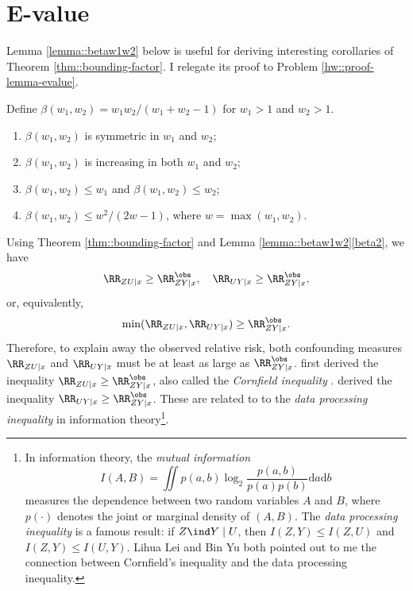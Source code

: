 \section{E-value}

Lemma \ref{lemma::betaw1w2} below is useful for deriving interesting corollaries of Theorem \ref{thm::bounding-factor}. I relegate its proof to Problem \ref{hw::proof-lemma-evalue}. 

\begin{lemma}
\label{lemma::betaw1w2}
Define $\beta(w_1, w_2) = w_1 w_2/(w_1 + w_2 - 1)$ for $w_1 > 1$ and $w_2 > 1$.  
\begin{enumerate}
[(1)]
\item
$\beta(w_1, w_2)$ is symmetric in $w_1$ and $w_2$;
\item
$\beta(w_1, w_2)$ is increasing in both $w_1$ and $w_2$;
\item\label{beta2}
$\beta(w_1, w_2) \leq w_1$ and $\beta(w_1, w_2) \leq w_2$;
\item\label{beta3}
$\beta(w_1, w_2) \leq w^2/(2w-1)$, where $w = \max(w_1, w_2)$.
\end{enumerate}
\end{lemma}



 


Using Theorem \ref{thm::bounding-factor} and Lemma \ref{lemma::betaw1w2}\eqref{beta2}, we have
$$
 \RR_{ZU\mid x} \geq \RR_{ZY\mid x}^\obs, \quad  \RR_{UY\mid x}  \geq \RR_{ZY\mid x}^\obs , 
$$
or, equivalently, 
$$
\min( \RR_{ZU\mid x} ,  \RR_{UY\mid x} ) \geq \RR_{ZY\mid x}^\obs.
$$
Therefore, to explain away the observed relative risk, both confounding measures $\RR_{ZU\mid x} $ and $  \RR_{UY\mid x}$ must be at least as large as $\RR_{ZY\mid x}^\obs$.
\citet{Cornfield::1959} first derived the inequality $\RR_{ZU\mid x} \geq \RR_{ZY\mid x}^\obs$, also called the {\it Cornfield inequality} \citep{gastwirth1998cornfield}. \citet{Schlesselman::1978} derived the inequality $\RR_{UY\mid x}  \geq \RR_{ZY\mid x}^\obs$. 
These are related to to the {\it data processing inequality} in information theory\footnote{In information theory, the {\it mutual information}  
$$
I(A,B) = \iint p(a,b) \log_2 \frac{  p(a,b) }{p(a)p(b)} \text{d} a \text{d} b
$$ 
measures the dependence between two random variables $A$ and $B$, where $p(\cdot)$ denotes the joint or marginal density of $(A,B)$. The {\it data processing inequality}  is a famous result: if $Z\ind Y \mid U$, then $I(Z,Y) \leq I(Z,U)$ and $I(Z,Y) \leq I(U,Y)$.
Lihua Lei and Bin Yu both pointed out to me the connection between Cornfield's inequality and the data processing inequality. 
}. 



